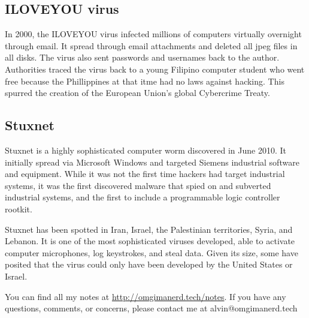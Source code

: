 \documentclass{math}
\begin{document}
\subsection*{ILOVEYOU virus}
In 2000, the ILOVEYOU virus infected millions of computers virtually overnight
through email. It spread through email attachments and deleted all jpeg files
in all disks. The virus also sent passwords and usernames back to the author.
Authorities traced the virus back to a young Filipino computer student who went
free because the Phillippines at that itme had no laws against hacking. This
spurred the creation of the European Union's global Cybercrime Treaty.

\subsection*{Stuxnet}
Stuxnet is a highly sophisticated computer worm discovered in June 2010. It
initially spread via Microsoft Windows and targeted Siemens industrial software
and equipment. While it was not the first time hackers had target industrial
systems, it was the first discovered malware that spied on and subverted
industrial systems, and the first to include a programmable logic controller
rootkit. \par
Stuxnet has been spotted in Iran, Israel, the Palestinian territories, Syria,
and Lebanon. It is one of the most sophisticated viruses developed, able to
activate computer microphones, log keystrokes, and steal data. Given its size,
some have posited that the virus could only have been developed by the United
States or Israel.

\begin{center}
  You can find all my notes at \url{http://omgimanerd.tech/notes}. If you have
  any questions, comments, or concerns, please contact me at
  alvin@omgimanerd.tech
\end{center}
\end{document}
